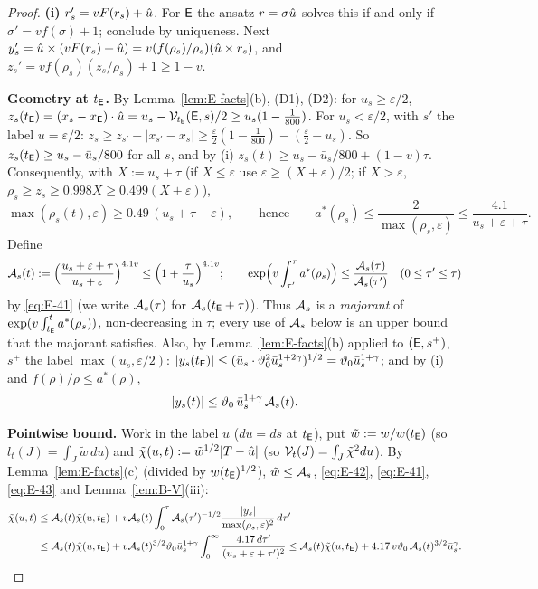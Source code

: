 \begin{proof}
\textbf{(i)} $r_s'=vF(r_s)+\hat u$. For $\mathsf E$ the ansatz $r=\sigma\hat u$ solves this if and only if $\sigma'=vf(\sigma)+1$; conclude by
uniqueness. Next $y_s'=\hat u\times(vF(r_s)+\hat u)=v(f(\rho_s)/\rho_s)(\hat u\times r_s)$, and
$z_s'=vf(\rho_s)(z_s/\rho_s)+1\ge1-v$.

\textbf{Geometry at $t_{\mathsf E}$.} By Lemma~\ref{lem:E-facts}(b), (D1), (D2): for $u_s\ge\varepsilon/2$,
$z_s(t_{\mathsf E})=(x_s-x_{\mathsf E})\cdot\hat u=u_s-\mathcal V_{t_{\mathsf E}}(\mathsf E,s)/2\ge u_s(1-\frac1{800})$. For $u_s<\varepsilon/2$, with $s'$ the label
$u=\varepsilon/2$: $z_s\ge z_{s'}-|x_{s'}-x_s|\ge\frac\varepsilon2(1-\frac1{800})-(\frac\varepsilon2-u_s)$. So
$z_s(t_{\mathsf E})\ge u_s-\bar u_s/800$ for all $s$, and by (i) $z_s(t)\ge u_s-\bar u_s/800+(1-v)\tau$. Consequently, with $X:=u_s+\tau$
(if $X\le\varepsilon$ use $\varepsilon\ge(X+\varepsilon)/2$; if $X>\varepsilon$, $\rho_s\ge z_s\ge0.998X\ge0.499(X+\varepsilon)$),
\begin{equation}\label{eq:E-41}
\max(\rho_s(t),\varepsilon)\ge0.49\,(u_s+\tau+\varepsilon),\qquad\text{hence}\qquad
a^*(\rho_s)\le\frac2{\max(\rho_s,\varepsilon)}\le\frac{4.1}{u_s+\varepsilon+\tau}.
\end{equation}
Define
\begin{equation}\label{eq:E-42}
\mathcal A_s(t):=\Bigl(\frac{u_s+\varepsilon+\tau}{u_s+\varepsilon}\Bigr)^{4.1v}\le\Bigl(1+\frac\tau{u_s}\Bigr)^{4.1v};\qquad
\exp\Bigl(v\int_{\tau'}^{\tau}a^*(\rho_s)\Bigr)\le\frac{\mathcal A_s(\tau)}{\mathcal A_s(\tau')}\quad(0\le\tau'\le\tau)
\end{equation}
by \eqref{eq:E-41} (we write $\mathcal A_s(\tau)$ for $\mathcal A_s(t_{\mathsf E}+\tau)$). Thus $\mathcal A_s$ is a \emph{majorant} of
$\exp(v\int_{t_{\mathsf E}}^ta^*(\rho_s))$, non-decreasing in $\tau$; every use of $\mathcal A_s$ below is an upper bound that the majorant
satisfies. Also, by Lemma~\ref{lem:E-facts}(b) applied to $(\mathsf E,s^+)$, $s^+$ the label $\max(u_s,\varepsilon/2)$:
$|y_s(t_{\mathsf E})|\le(\bar u_s\cdot\vartheta_0^2\bar u_s^{1+2\gamma})^{1/2}=\vartheta_0\bar u_s^{1+\gamma}$; and by (i) and
$f(\rho)/\rho\le a^*(\rho)$,
\begin{equation}\label{eq:E-43}
|y_s(t)|\le\vartheta_0\,\bar u_s^{1+\gamma}\,\mathcal A_s(t).
\end{equation}

\textbf{Pointwise bound.} Work in the label $u$ ($du=ds$ at $t_{\mathsf E}$), put $\tilde w:=w/w(t_{\mathsf E})$ (so $l_t(J)=\int_J\tilde w\,du$) and
$\tilde\chi(u,t):=\tilde w^{1/2}|T-\hat u|$ (so $\mathcal V_t(J)=\int_J\tilde\chi^2du$). By Lemma~\ref{lem:E-facts}(c) (divided by
$w(t_{\mathsf E})^{1/2}$), $\tilde w\le\mathcal A_s$, \eqref{eq:E-42}, \eqref{eq:E-41}, \eqref{eq:E-43} and Lemma~\ref{lem:B-V}(iii):
\begin{align}
\tilde\chi(u,t)&\le\mathcal A_s(t)\tilde\chi(u,t_{\mathsf E})+v\mathcal A_s(t)\int_0^\tau\mathcal A_s(\tau')^{-1/2}\frac{|y_s|}{\max(\rho_s,\varepsilon)^2}\,d\tau'\notag\\
&\le\mathcal A_s(t)\tilde\chi(u,t_{\mathsf E})+v\mathcal A_s(t)^{3/2}\vartheta_0\bar u_s^{1+\gamma}\int_0^\infty\frac{4.17\,d\tau'}{(u_s+\varepsilon+\tau')^2}
\le\mathcal A_s(t)\tilde\chi(u,t_{\mathsf E})+4.17\,v\vartheta_0\,\mathcal A_s(t)^{3/2}\bar u_s^\gamma .\label{eq:E-44}
\end{align}


\end{proof}

